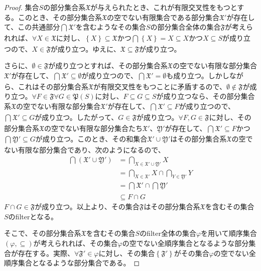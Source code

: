 \documentclass[dvipdfmx]{jsarticle}
\begin{document}
\begin{proof}
集合$S$の部分集合系$\mathfrak{X}$が与えられたとき、これが有限交叉性をもつとする。このとき、その部分集合系$\mathfrak{X}$の空でない有限集合である部分集合$\mathfrak{X}'$が存在して、この共通部分$\bigcap_{} \mathfrak{X}'$を含むようなその集合$S$の部分集合全体の集合$\mathfrak{F}$が考えられれば、$\forall X \in \mathfrak{X}$に対し、$\left\{ X \right\}\subseteq \mathfrak{X}$かつ$\bigcap_{} \left\{ X \right\} = X \subseteq X$かつ$X \subseteq S$が成り立つので、$X \in \mathfrak{F}$が成り立つ。ゆえに、$\mathfrak{X \subseteq F}$が成り立つ。\par
さらに、$\emptyset \in \mathfrak{F}$が成り立つとすれば、その部分集合系$\mathfrak{X}$の空でない有限な部分集合$\mathfrak{X}'$が存在して、$\bigcap_{} \mathfrak{X}' \subseteq \emptyset$が成り立つので、$\bigcap_{} \mathfrak{X}' = \emptyset$も成り立つ。しかしながら、これはその部分集合系$\mathfrak{X}$が有限交叉性をもつことに矛盾するので、$\emptyset \notin \mathfrak{F}$が成り立つ。$\forall F \in \mathfrak{F}\forall G \in \mathfrak{P}(S)$に対し、$F \subseteq G \subseteq S$が成り立つなら、その部分集合系$\mathfrak{X}$の空でない有限な部分集合$\mathfrak{X}'$が存在して、$\bigcap_{} \mathfrak{X}' \subseteq F$が成り立つので、$\bigcap_{} \mathfrak{X}' \subseteq G$が成り立つ。したがって、$G \in \mathfrak{F}$が成り立つ。$\forall F,G \in \mathfrak{F}$に対し、その部分集合系$\mathfrak{X}$の空でない有限な部分集合たち$\mathfrak{X}'$、$\mathfrak{Y}'$が存在して、$\bigcap_{} \mathfrak{X}' \subseteq F$かつ$\bigcap_{} \mathfrak{Y}' \subseteq G$が成り立つ。このとき、その和集合$\mathfrak{X}' \cup \mathfrak{Y}'$はその部分集合系$\mathfrak{X}$の空でない有限な部分集合であり、次のようになるので、
\begin{align*}
\bigcap_{} \left( \mathfrak{X}' \cup \mathfrak{Y}' \right) &= \bigcap_{X \in \mathfrak{X}' \cup \mathfrak{Y}'} X\\
&= \bigcap_{X \in \mathfrak{X}'} X \cap \bigcap_{Y \in \mathfrak{Y}'} Y\\
&= \bigcap_{} \mathfrak{X}' \cap \bigcap_{} \mathfrak{Y}'\\
&\subseteq F \cap G
\end{align*}
$F \cap G \in \mathfrak{F}$が成り立つ。以上より、その集合$\mathfrak{F}$はその部分集合系$\mathfrak{X}$を含むその集合$S$のfilterとなる。\par
そこで、その部分集合系$\mathfrak{X}$を含むその集合$S$のfilter全体の集合$\varphi$を用いて順序集合$(\varphi, \subseteq )$が考えられれば、その集合$\varphi$の空でない全順序集合となるような部分集合が存在する。実際、$\forall\mathfrak{F}' \in \varphi$に対し、その集合$\left\{ \mathfrak{F}' \right\}$がその集合$\varphi$の空でない全順序集合となるような部分集合である。\par

\end{proof}
\end{document}
